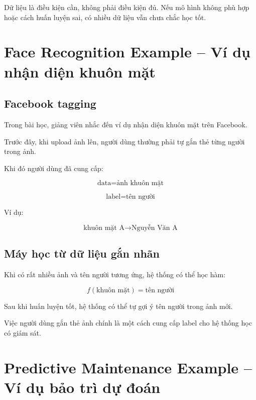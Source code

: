 \begin{canhbao}
Dữ liệu là điều kiện cần, không phải điều kiện đủ. Nếu mô hình không phù hợp hoặc cách huấn luyện sai, có nhiều dữ liệu vẫn chưa chắc học tốt.
\end{canhbao}

\section{Face Recognition Example -- Ví dụ nhận diện khuôn mặt}

\subsection{Facebook tagging}

Trong bài học, giảng viên nhắc đến ví dụ nhận diện khuôn mặt trên Facebook.

Trước đây, khi upload ảnh lên, người dùng thường phải tự gắn thẻ từng người trong ảnh.

Khi đó người dùng đã cung cấp:

\[
    \text{data} = \text{ảnh khuôn mặt}
\]

\[
    \text{label} = \text{tên người}
\]

Ví dụ:

\[
    \text{khuôn mặt A}
    \rightarrow
    \text{Nguyễn Văn A}
\]

\subsection{Máy học từ dữ liệu gắn nhãn}

Khi có rất nhiều ảnh và tên người tương ứng, hệ thống có thể học hàm:

\[
    f(\text{khuôn mặt}) = \text{tên người}
\]

Sau khi huấn luyện tốt, hệ thống có thể tự gợi ý tên người trong ảnh mới.

\begin{ghinho}
Việc người dùng gắn thẻ ảnh chính là một cách cung cấp label cho hệ thống học có giám sát.
\end{ghinho}

\section{Predictive Maintenance Example -- Ví dụ bảo trì dự đoán}

